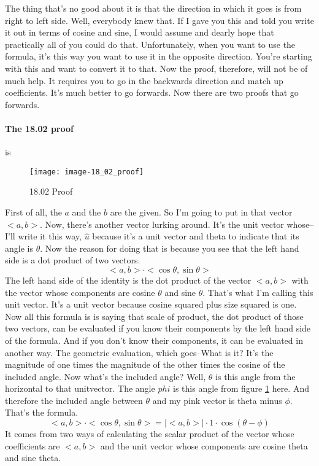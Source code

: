 The thing that's no good about it is that the direction in which it goes is from right to left side.
Well, everybody knew that. If I gave you this and told you write it out
in terms of cosine and sine, I would assume and dearly hope that practically all of you could do that.
Unfortunately, when you want to use the formula, it's this way you want to use it in the opposite direction.
You're starting with this and want to convert it to that.
Now the proof, therefore, will not be of much help.
It requires you to go in the backwards direction and match up coefficients.
It's much better to go forwards.
Now there are two proofs that go forwards.
\clearpage

\paragraph{The 18.02 proof} is
\begin{figure}[ht!]
  \centering
  \texttt{[image: image-18\_02\_proof]}
  \caption{18.02 Proof}
  \label{fig:18.02 Proof}
\end{figure}

First of all, the $a$ and the $b$ are the given.
So I'm going to put in that vector $< a, b>$.
Now, there's another vector lurking around.
It's the unit vector whose-- I'll write it this way, $\hat u$ because it's
a unit vector and theta to indicate that its angle is $\theta$.
Now the reason for doing that is because you
see that the left hand side is a dot product of two vectors.
\begin{equation*}
  <a , b> \cdot <\cos \theta, \sin \theta>
\end{equation*}
The left hand side of the identity is the dot product of the vector $<a, b>$ with the vector
whose components are cosine $\theta$ and sine $\theta$.
That's what I'm calling this unit vector.
It's a unit vector because cosine squared plus size squared is one.
Now all this formula is is saying that scale of product, the dot product of those two vectors,
can be evaluated if you know their components by the left hand side of the formula.
And if you don't know their components, it can be evaluated in another way.
The geometric evaluation, which goes--What is it?
It's the magnitude of one times the magnitude of the other times the cosine of the included angle.
Now what's the included angle?
Well, $\theta$ is this angle from the horizontal to that unitvector.
The angle $phi$ is this angle from figure \ref{fig:18.02 Proof} here.
And therefore the included angle between $\theta$ and my pink vector is theta minus $\phi$.
That's the formula.
\begin{equation*}
  <a , b> \cdot < \cos \theta, \sin \theta > = |<a, b>| \cdot 1 \cdot \cos (\theta - \phi)
\end{equation*}
It comes from two ways of calculating the scalar product of the vector whose coefficients are
$<a, b>$ and the unit vector whose components are cosine theta and sine theta.\\

